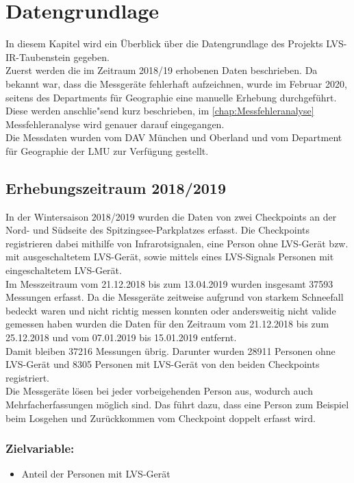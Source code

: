 \documentclass[12pt]{scrreprt}
\begin{document}
\chapter{Datengrundlage}
In diesem Kapitel wird ein Überblick über die Datengrundlage des Projekts LVS-IR-Taubenstein gegeben. \\
Zuerst werden die im Zeitraum 2018/19 erhobenen Daten beschrieben. Da bekannt war, dass die Messgeräte fehlerhaft aufzeichnen, wurde im Februar 2020, seitens des Departments für Geographie eine manuelle Erhebung durchgeführt. Diese werden anschlie"send kurz beschrieben, im \autoref{chap:Messfehleranalyse} Messfehleranalyse wird genauer darauf eingegangen. \\
Die Messdaten wurden vom DAV München und Oberland und vom Department für Geographie der LMU zur Verfügung gestellt.

\section{Erhebungszeitraum 2018/2019}
In der Wintersaison 2018/2019 wurden die Daten von zwei Checkpoints an der Nord- und Südseite des Spitzingsee-Parkplatzes erfasst. Die Checkpoints registrieren dabei mithilfe von Infrarotsignalen, eine Person ohne LVS-Gerät bzw. mit ausgeschaltetem LVS-Gerät, sowie mittels eines LVS-Signals Personen mit eingeschaltetem LVS-Gerät. \\
Im Messzeitraum vom 21.12.2018 bis zum 13.04.2019 wurden insgesamt 37593 Messungen erfasst. Da die Messgeräte zeitweise aufgrund von starkem Schneefall bedeckt waren und nicht richtig messen konnten oder andersweitig nicht valide gemessen haben wurden die Daten für den Zeitraum vom 21.12.2018 bis zum 25.12.2018 und vom 07.01.2019 bis 15.01.2019 entfernt. \\
Damit bleiben 37216 Messungen übrig. Darunter wurden 28911 Personen ohne LVS-Gerät und 8305 Personen mit LVS-Gerät von den beiden Checkpoints registriert. \\
Die Messgeräte lösen bei jeder vorbeigehenden Person aus, wodurch auch Mehrfacherfassungen möglich sind. Das führt dazu, dass eine Person zum Beispiel beim Losgehen und Zurückkommen vom Checkpoint doppelt erfasst wird. \\
\subsection*{Zielvariable:}
\begin{itemize}
	\item Anteil der Personen mit LVS-Gerät
\end{itemize}
\end{document}
